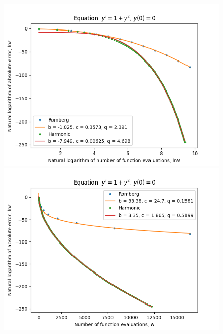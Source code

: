 \begin{figure}[H]
\centering
\begin{minipage}{0.45\textwidth}
\centering
\includegraphics[scale=0.45]{emr_plots/tangens_hp_log_log_pow_fit_trend.png}
\end{minipage}
\begin{minipage}{0.45\textwidth}
\centering
\includegraphics[scale=0.45]{emr_plots/tangens_hp_trend.png}
\end{minipage}
\end{figure}

